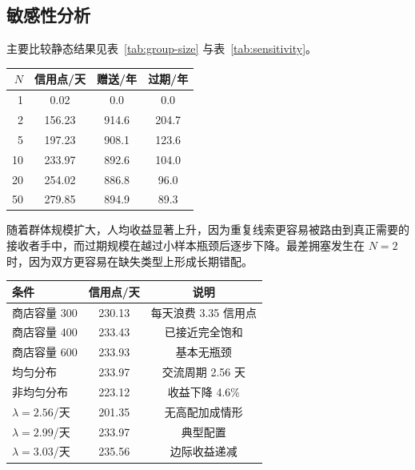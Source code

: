 \documentclass{rubbish}
\begin{document}
\begin{rubbishbody}
\subsection{敏感性分析}

主要比较静态结果见表~\ref{tab:group-size} 与表~\ref{tab:sensitivity}。

\noindent
\begin{minipage}{\columnwidth}
\label{tab:group-size}
\vspace{2pt}
\centering
\small
\begin{tabular}{@{}rccc@{}}
  \toprule
  \textbf{$N$} & \textbf{信用点/天} & \textbf{赠送/年} & \textbf{过期/年} \\
  \midrule
   1 & 0.02   & 0.0   & 0.0 \\
   2 & 156.23 & 914.6 & 204.7 \\
   5 & 197.23 & 908.1 & 123.6 \\
  10 & 233.97 & 892.6 & 104.0 \\
  20 & 254.02 & 886.8 & 96.0 \\
  50 & 279.85 & 894.9 & 89.3 \\
  \bottomrule
\end{tabular}
\end{minipage}

随着群体规模扩大，人均收益显著上升，因为重复线索更容易被路由到真正需要的接收者手中，而过期规模在越过小样本瓶颈后逐步下降。最差拥塞发生在 $N=2$ 时，因为双方更容易在缺失类型上形成长期错配。

\noindent
\begin{minipage}{\columnwidth}
\label{tab:sensitivity}
\vspace{2pt}
\centering
\small
\begin{tabular}{@{}lcc@{}}
  \toprule
  \textbf{条件} & \textbf{信用点/天} & \textbf{说明} \\
  \midrule
  商店容量 300      & 230.13 & 每天浪费 3.35 信用点 \\
  商店容量 400      & 233.43 & 已接近完全饱和 \\
  商店容量 600      & 233.93 & 基本无瓶颈 \\
  均匀分布          & 233.97 & 交流周期 2.56 天 \\
  非均匀分布        & 223.12 & 收益下降 4.6\% \\
  $\lambda=2.56$/天 & 201.35 & 无高配加成情形 \\
  $\lambda=2.99$/天 & 233.97 & 典型配置 \\
  $\lambda=3.03$/天 & 235.56 & 边际收益递减 \\
  \bottomrule
\end{tabular}
\end{minipage}


\end{rubbishbody}
\end{document}
